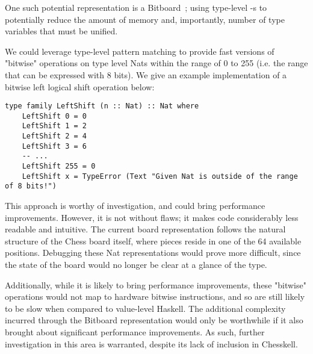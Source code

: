 One such potential representation is a Bitboard~\cite{bitboard}; using type-level -s to potentially reduce the amount of memory and, importantly, number of type variables that must be unified.

We could leverage type-level pattern matching to provide fast versions of "bitwise" operations on type level Nats within the range of 0 to 255 (i.e. the range that can be expressed with 8 bits). We give an example implementation of a bitwise left logical shift operation below:

\begin{lstlisting}
type family LeftShift (n :: Nat) :: Nat where
    LeftShift 0 = 0
    LeftShift 1 = 2
    LeftShift 2 = 4
    LeftShift 3 = 6
    -- ...
    LeftShift 255 = 0
    LeftShift x = TypeError (Text "Given Nat is outside of the range of 8 bits!")
\end{lstlisting}

This approach is worthy of investigation, and could bring performance improvements. However, it is not without flaws; it makes code considerably less readable and intuitive. The current board representation follows the natural structure of the Chess board itself, where pieces reside in one of the 64 available positions. Debugging these Nat representations would prove more difficult, since the state of the board would no longer be clear at a glance of the type.

Additionally, while it is likely to bring performance improvements, these "bitwise" operations would not map to hardware bitwise instructions, and so are still likely to be slow when compared to value-level Haskell. The additional complexity incurred through the Bitboard representation would only be worthwhile if it also brought about significant performance improvements. As such, further investigation in this area is warranted, despite its lack of inclusion in Chesskell.